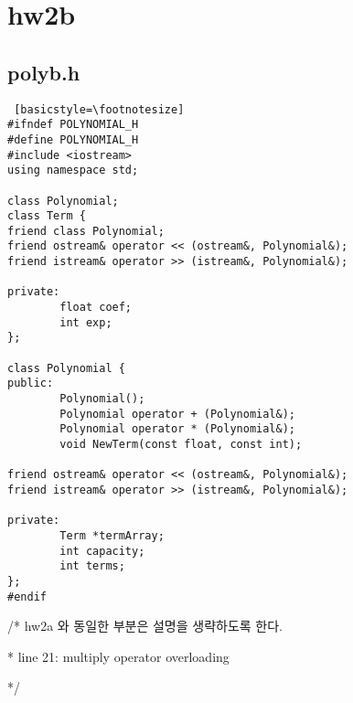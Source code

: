 \documentclass[twoside,twocolumn]{article}
\newenvironment{itemizeReduced}{
\begin{list}{\labelitemi}{\leftmargin=1em}
\setlength{\itemsep}{1pt}
\setlength{\parskip}{0pt}
\setlength{\parsep}{0pt}}{\end{list}
}
\begin{document}
\clearpage

\section{hw2b}
\subsection{polyb.h}
\begin{lstlisting} [basicstyle=\footnotesize]
#ifndef POLYNOMIAL_H
#define POLYNOMIAL_H
#include <iostream>
using namespace std;

class Polynomial;
class Term {
friend class Polynomial;
friend ostream& operator << (ostream&, Polynomial&);
friend istream& operator >> (istream&, Polynomial&);

private:
        float coef;
        int exp;
};

class Polynomial {
public:
        Polynomial();
        Polynomial operator + (Polynomial&);
        Polynomial operator * (Polynomial&);
        void NewTerm(const float, const int);

friend ostream& operator << (ostream&, Polynomial&);
friend istream& operator >> (istream&, Polynomial&);

private:
        Term *termArray;
        int capacity;
        int terms;
};
#endif
\end{lstlisting}
\begin{itemizeReduced}
    \item[/*] hw2a 와 동일한 부분은 설명을 생략하도록 한다.
    \item[*] line 21: multiply operator overloading
\end{itemizeReduced}
*/
\end{document}
